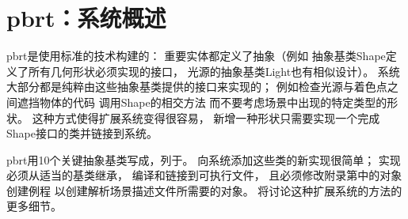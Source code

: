 \section{pbrt：系统概述}\label{sec:pbrt：系统概述}

pbrt是使用标准的技术构建的：
重要实体都定义了抽象（例如
抽象基类{\ttfamily Shape}定义了所有几何形状必须实现的接口，
光源的抽象基类{\ttfamily Light}也有相似设计）。
系统大部分都是纯粹由这些抽象基类提供的接口来实现的；
例如检查光源与着色点之间遮挡物体的代码
调用{\ttfamily Shape}的相交方法
而不要考虑场景中出现的特定类型的形状。
这种方式使得扩展系统变得很容易，
新增一种形状只需要实现一个完成{\ttfamily Shape}接口的类并链接到系统。

pbrt用10个关键抽象基类写成，列于。
向系统添加这些类的新实现很简单；
实现必须从适当的基类继承，
编译和链接到可执行文件，
且必须修改附录第中的对象创建例程
以创建解析场景描述文件所需要的对象。
将讨论这种扩展系统的方法的更多细节。


